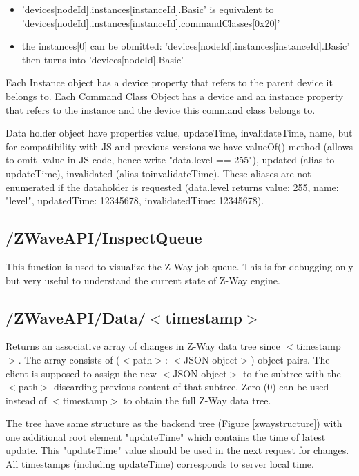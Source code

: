 \begin{itemize}
\item 'devices[nodeId].instances[instanceId].Basic' is equivalent to \\
'devices[nodeId].instances[instanceId].commandClasses[0x20]'
\item the instances[0] can be obmitted: 'devices[nodeId].instances[instanceId].Basic' 
then turns into 'devices[nodeId].Basic'
\end{itemize} 

Each Instance object has a device property that refers to the parent device it belongs to. 
Each Command Class Object has a device and an instance property that refers to the instance 
and the device this command class belongs to.
 

Data holder object have properties value, updateTime, invalidateTime, name, but for 
compatibility with JS and previous versions we have valueOf() method (allows to 
omit .value in JS code, hence write "data.level == 255"), updated (alias to updateTime), 
invalidated (alias toinvalidateTime). These aliases are not enumerated if the dataholder 
is requested (data.level returns {value: 255, name: "level", updatedTime: 12345678, 
invalidatedTime: 12345678}).

\subsection{/ZWaveAPI/InspectQueue}

This function is used to visualize the Z-Way job queue. This is for debugging only but 
very useful to understand the current state of Z-Way engine.

\subsection{/ZWaveAPI/Data/$<$timestamp$>$}
Returns an associative array of changes in Z-Way data tree since $<$timestamp$>$. The 
array consists of ($<$path$>$: $<$JSON object$>$) object pairs. The client is supposed 
to assign the new $<$JSON object$>$ to the subtree with the $<$path$>$ discarding previous 
content of that subtree. Zero (0) can be used instead of $<$timestamp$>$ to obtain the 
full Z-Way data tree.

The tree have same structure as the backend tree (Figure \ref{zwaystructure}) with 
one additional root element "updateTime" which contains the time of latest update. 
This "updateTime" value should be used in the next request for changes. 
All timestamps (including updateTime) corresponds to server local time.

